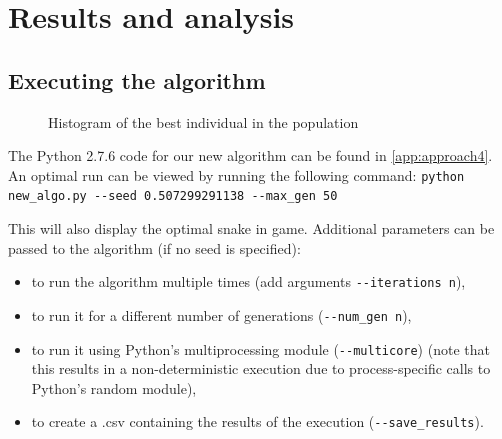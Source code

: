 \documentclass[british,10pt,a4paper]{article}
\begin{document}
\section{Results and analysis}
\subsection{Executing the algorithm}
\label{subsec:results_score}
\begin{figure}
	\centering
	\vspace{-30pt}
	\vspace{-10pt}
	\caption{Histogram of the best individual in the population}
	\label{fig:approach1_vs_approach4}
	\vspace{-30pt}
\end{figure}
The Python 2.7.6 code for our new algorithm can be found in \autoref{app:approach4}. An optimal run can be viewed by running the following command: 
\lstinline{python new_algo.py --seed 0.507299291138 --max_gen 50}

This will also display the optimal snake in game. Additional parameters can be passed to the algorithm (if no seed is specified):
\begin{itemize}
	\item to run the algorithm multiple times (add arguments \lstinline{--iterations n}), 
	\item to run it for a different number of generations (\lstinline{--num_gen n}), 
	\item to run it using Python's multiprocessing module (\lstinline{--multicore}) (note that this results in a non-deterministic execution due to process-specific calls to Python's random module), 
	\item to create a .csv containing the results of the execution (\lstinline{--save_results}).
\end{itemize}
\end{document}
